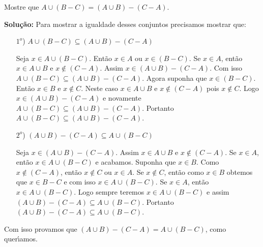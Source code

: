 \documentclass[12pt]{article}
\newcounter{exercicios}
\newcommand{\questao}{
\addtocounter{exercicios}{1}
\noindent{\bf Exerc{\'\i}cio \arabic{exercicios}: }}
\begin{document}
\vspace{.5cm}

\questao Mostre que $A \cup ( B - C) = (A \cup B) - (C - A)$.

\noindent\textbf{Solu\c{c}\~ao:} Para mostrar a igualdade desses conjuntos precisamos mostrar que:
\begin{enumerate}
	\item [$1^o$)] $A \cup ( B - C) \subseteq (A \cup B) - (C - A)$

	Seja $x \in A \cup (B - C)$. Ent\~ao $x \in A$ ou $x \in (B - C)$. Se $x \in A$, ent\~ao $x \in A \cup B$ e $x \notin (C - A)$. Assim $x \in (A \cup B) - (C - A)$. Com isso $A \cup ( B - C) \subseteq (A \cup B) - (C - A)$. Agora suponha que $x \in (B - C)$. Ent\~ao $x \in B$ e $x \notin C$. Neste caso $x \in A \cup B$ e $x \notin (C - A)$ pois $x \notin C$. Logo $x \in (A \cup B) - (C - A)$ e novamente $A \cup ( B - C) \subseteq (A \cup B) - (C - A)$. Portanto $A \cup ( B - C) \subseteq (A \cup B) - (C - A)$.

	\item [$2^o$)] $(A \cup B) - (C - A) \subseteq A \cup ( B - C)$

	Seja $x \in (A \cup B) - (C - A)$. Assim $x \in A \cup B$ e $x \notin (C - A)$. Se $x \in A$, ent\~ao $x \in A \cup (B - C)$ e acabamos. Suponha que $x \in B$. Como $x \notin (C - A)$, ent\~ao $x \notin C$ ou $x \in A$. Se $x \notin C$, ent\~ao como $x \in B$ obtemos que $x \in B - C$ e com isso $x \in A \cup (B - C)$. Se $x \in A$, ent\~ao $x \in A \cup (B - C)$. Logo sempre teremos $x \in A \cup (B - C)$ e assim $(A \cup B) - (C - A) \subseteq A \cup ( B - C)$. Portanto $(A \cup B) - (C - A) \subseteq A \cup ( B - C)$.
\end{enumerate}
Com isso provamos que $(A \cup B) - (C - A) = A \cup ( B - C)$, como quer{\'\i}amos.
\end{document}
